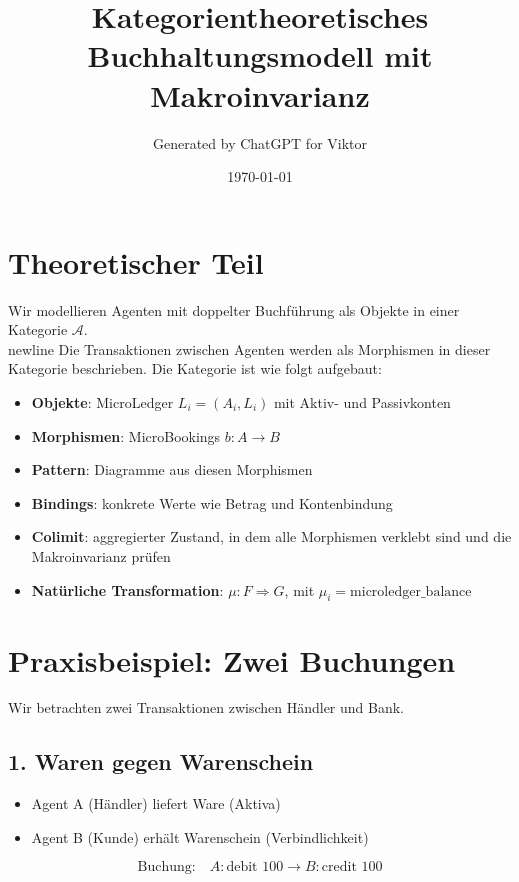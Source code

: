 \documentclass{article}
\title{Kategorientheoretisches Buchhaltungsmodell mit Makroinvarianz}
\author{Generated by ChatGPT for Viktor}
\date{\today}
\begin{document}
\maketitle

\section*{Theoretischer Teil}

Wir modellieren Agenten mit doppelter Buchführung als Objekte in einer Kategorie \( \mathcal{A} \).\\newline
Die Transaktionen zwischen Agenten werden als Morphismen in dieser Kategorie beschrieben. Die Kategorie ist wie folgt aufgebaut:

\begin{itemize}
  \item \textbf{Objekte}: MicroLedger \( L_i = (A_i, L_i) \) mit Aktiv- und Passivkonten
  \item \textbf{Morphismen}: MicroBookings \( b: A \to B \)
  \item \textbf{Pattern}: Diagramme aus diesen Morphismen
  \item \textbf{Bindings}: konkrete Werte wie Betrag und Kontenbindung
  \item \textbf{Colimit}: aggregierter Zustand, in dem alle Morphismen verklebt sind und die Makroinvarianz prüfen
  \item \textbf{Natürliche Transformation}: \( \mu: F \Rightarrow G \), mit \( \mu_i = \text{microledger\_balance} \)
\end{itemize}

\section*{Praxisbeispiel: Zwei Buchungen}

Wir betrachten zwei Transaktionen zwischen Händler und Bank.

\subsection*{1. Waren gegen Warenschein}

\begin{itemize}
  \item Agent A (Händler) liefert Ware (Aktiva)
  \item Agent B (Kunde) erhält Warenschein (Verbindlichkeit)
\end{itemize}

\[
\text{Buchung:} \quad A: \text{debit } 100 \longrightarrow B: \text{credit } 100
\]
\end{document}
